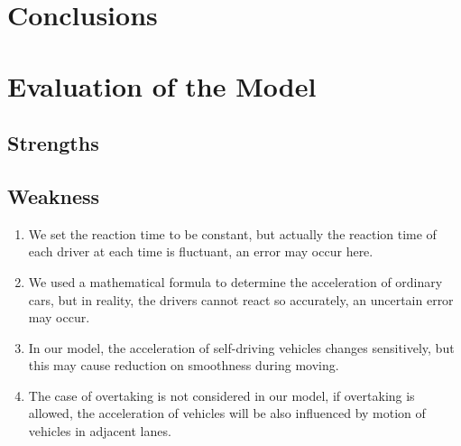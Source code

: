 \documentclass{icmmcm}
\begin{document}
\section{Conclusions}
\section{Evaluation of the Model}
\subsection{Strengths}
\subsection{Weakness}
\begin{enumerate}
\item We set the reaction time to be constant, but actually the reaction time of each driver at each time is fluctuant, an error may occur here.
\item We used a mathematical formula to determine the acceleration of ordinary cars, but in reality, the drivers cannot react so accurately, an uncertain error may occur.
\item In our model, the acceleration of self-driving vehicles changes sensitively, but this may cause reduction on smoothness during moving.
\item The case of overtaking is not considered in our model, if overtaking is allowed, the acceleration of vehicles will be also influenced by motion of vehicles in adjacent lanes. 
\end{enumerate}







\end{document}
